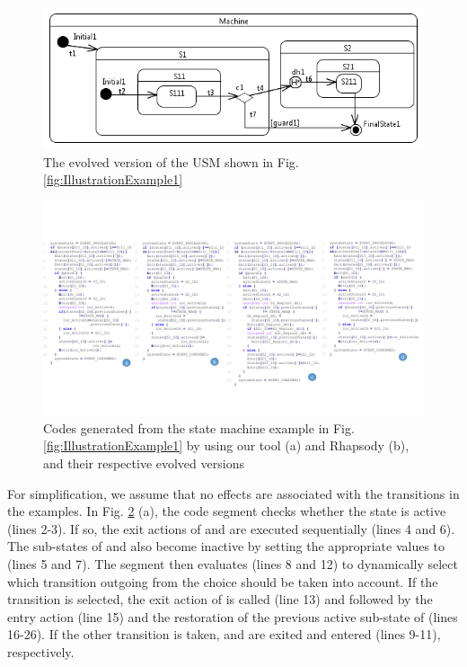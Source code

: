 \begin{figure}
	\centering
	\includegraphics[clip, trim=0.2cm 0.2cm 0.1cm 0.2cm, width=1.0\columnwidth]{figures/IllustrationExample2.png}
	\caption{The evolved version of the USM shown in Fig. \ref{fig:IllustrationExample1}} 
	\label{fig:IllustrationExample2}
\end{figure}

\begin{figure}
	\centering
	\includegraphics[clip, trim=0cm 2.6cm 0cm 3.4cm, width=\textwidth]{figures/generatedcode.pdf}
	\caption{Codes generated from the state machine example in Fig. \ref{fig:IllustrationExample1} by using our tool (a) and Rhapsody (b), and their respective evolved versions} 
	\label{fig:generatedcode}
\end{figure}


For simplification, we assume that no effects are associated with the transitions in the examples.
In Fig. \ref{fig:generatedcode} (a), the code segment checks whether the state  is active (lines 2-3).
If so, the exit actions of  and  are executed sequentially (lines 4 and 6).
The sub-states of  and  also become inactive by setting the appropriate values to  (lines 5 and 7).
The segment then evaluates  (lines 8 and 12) to dynamically select which transition outgoing from the choice  should be taken into account.
If the transition  is selected, the exit action of  is called (line 13) and followed by the entry action (line 15) and the restoration of the previous active sub-state of  (lines 16-26). 
If the other transition  is taken,  and  are exited and entered (lines 9-11), respectively.

